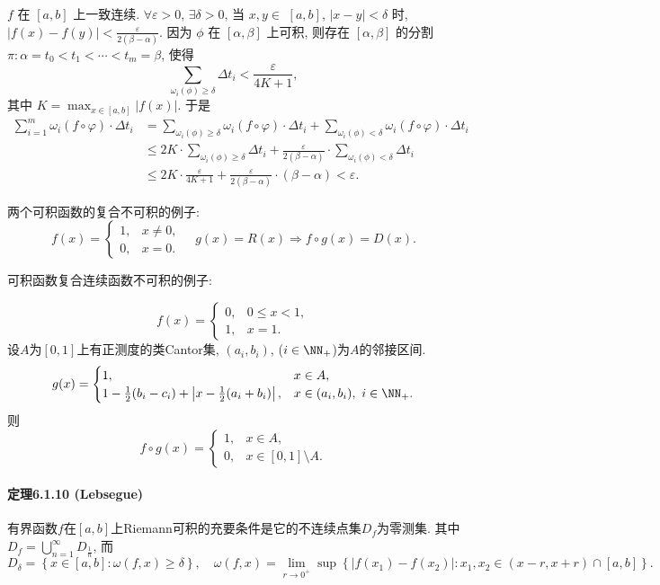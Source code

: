 $f$ 在 $[a,b]$ 上一致连续. $\forall\varepsilon>0$, $\exists\delta>0$,
当 $x,y\in$ $[a,b]$, $|x-y|<\delta$ 时, $|f(x)-f(y)|<\frac{\varepsilon}{2(\beta-\alpha)}$.
因为 $\phi$ 在 $[\alpha,\beta]$ 上可积, 则存在 $[\alpha,\beta]$ 的分割 $\pi:\alpha=t_{0}<t_{1}<\cdots<t_{m}=\beta$,
使得 
\[
\sum_{\omega_{i}(\phi)\geqslant\delta}\Delta t_{i}<\frac{\varepsilon}{4K+1},
\]
其中 $K=\max_{x\in[a,b]}|f(x)|$. 于是 
\[
\begin{aligned}\sum_{i=1}^{m}\omega_{i}(f\circ\varphi)\cdot\Delta t_{i} & =\sum_{\omega_{i}(\phi)\geqslant\delta}\omega_{i}(f\circ\varphi)\cdot\Delta t_{i}+\sum_{\omega_{i}(\phi)<\delta}\omega_{i}(f\circ\varphi)\cdot\Delta t_{i}\\
	& \leqslant2K\cdot\sum_{\omega_{i}(\phi)\geqslant\delta}\Delta t_{i}+\frac{\varepsilon}{2(\beta-\alpha)}\cdot\sum_{\omega_{i}(\phi)<\delta}\Delta t_{i}\\
	& \leqslant2K\cdot\frac{\varepsilon}{4K+1}+\frac{\varepsilon}{2(\beta-\alpha)}\cdot(\beta-\alpha)<\varepsilon.
\end{aligned}
\]

两个可积函数的复合不可积的例子: 
\[
f(x)=\begin{cases}
	1, & x\ne0,\\
	0, & x=0.
\end{cases}\quad g(x)=R(x)\Longrightarrow f\circ g(x)=D(x).
\]

可积函数复合连续函数不可积的例子:

\[
f(x)=\begin{cases}
	0, & 0\le x<1,\\
	1, & x=1.
\end{cases}
\]
设$A$为$[0,1]$上有正测度的类Cantor集, $(a_{i},b_{i})$, ($i\in\NN_{+}$)为$A$的邻接区间.
\[
g(x)=\begin{cases}
	1, & x\in A,\\
	1-\frac{1}{2}(b_{i}-c_{i})+\left|x-\frac{1}{2}(a_{i}+b_{i})\right|, & x\in(a_{i},b_{i}),\ i\in\NN_{+}.
\end{cases}
\]
则
\[
f\circ g(x)=\begin{cases}
	1, & x\in A,\\
	0, & x\in[0,1]\setminus A.
\end{cases}
\]


\paragraph{定理6.1.10 (Lebsegue)}

有界函数$f$在$[a,b]$上Riemann可积的充要条件是它的不连续点集$D_{f}$为零测集. 其中$D_{f}=\bigcup_{n=1}^{\infty}D_{\frac{1}{n}}$,
而
\[
D_{\delta}=\left\{ x\in[a,b]:\omega(f,x)\ge\delta\right\} ,\quad\omega(f,x)=\lim_{r\rightarrow0^{+}}\sup\left\{ \left|f\left(x_{1}\right)-f\left(x_{2}\right)\right|:x_{1},x_{2}\in(x-r,x+r)\cap[a,b]\right\} .
\]


